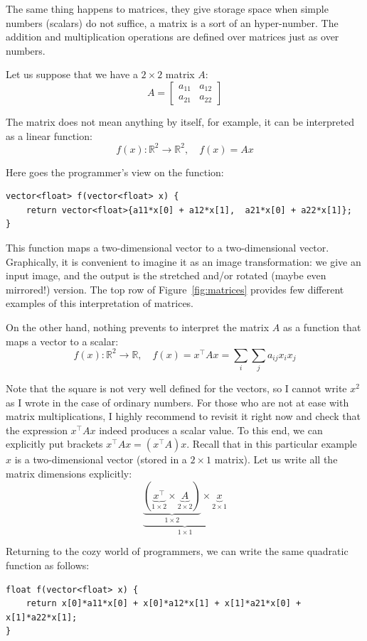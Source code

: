 \documentclass[notitlepage,oneside]{book}
\begin{document}
The same thing happens to matrices, they give storage space when simple numbers (scalars) do not suffice, a matrix is a sort of an hyper-number.
The addition and multiplication operations are defined over matrices just as over numbers.

Let us suppose that we have a $2\times 2$ matrix $A$:
$$
A=\begin{bmatrix} a_{11} & a_{12} \\ a_{21} & a_{22}\end{bmatrix}
$$

The matrix does not mean anything by itself, for example, it can be interpreted as a linear function:
$$
f(x) : \mathbb R^2 \rightarrow \mathbb R^2, \quad f(x) = Ax
$$

Here goes the programmer's view on the function:
\begin{verbatim}
vector<float> f(vector<float> x) {
    return vector<float>{a11*x[0] + a12*x[1],  a21*x[0] + a22*x[1]};
}
\end{verbatim}

This function maps a two-dimensional vector to a two-dimensional vector.
Graphically, it is convenient to imagine it as an image transformation: we give an input image, and the output is the stretched and/or rotated (maybe even mirrored!) version.
The top row of Figure~\ref{fig:matrices} provides few different examples of this interpretation of matrices.

On the other hand, nothing prevents to interpret the matrix $A$ as a function that maps a vector to a scalar:
$$
f(x) : \mathbb R^2 \rightarrow \mathbb R, \quad f(x) = x^\top A x = \sum\limits_i\sum\limits_j a_{ij}x_i x_j
$$

Note that the square is not very well defined for the vectors, so I cannot write $x^2$ as I wrote in the case of ordinary numbers. 
For those who are not at ease with matrix multiplications, I highly recommend to revisit it right now and check that the expression $x^\top A x$ indeed produces a scalar value.
To this end, we can explicitly put brackets $x^\top A x = (x^\top A) x$.
Recall that in this particular example $x$ is a two-dimensional vector (stored in a $2\times 1$ matrix).
Let us write all the matrix dimensions explicitly:
$$
\underbrace{\underbrace{\left(\underbrace{x^\top}_{1\times 2} \times \underbrace{A}_{2\times 2}\right)}_{1\times 2} \times \underbrace{x}_{2\times 1}}_{1 \times 1}
$$

Returning to the cozy world of programmers, we can write the same quadratic function as follows:
\begin{verbatim}
float f(vector<float> x) {
    return x[0]*a11*x[0] + x[0]*a12*x[1] + x[1]*a21*x[0] + x[1]*a22*x[1];
}
\end{verbatim}
\end{document}
